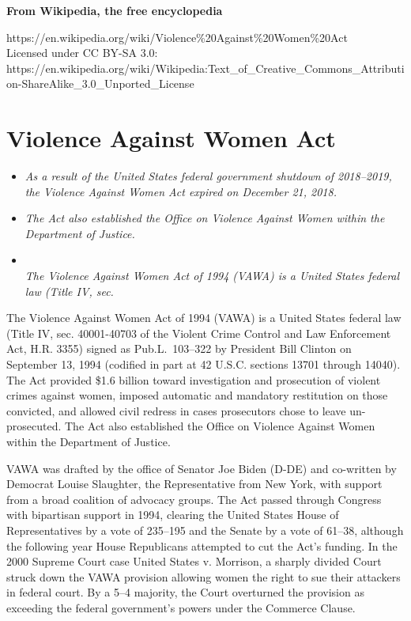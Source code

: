 \textbf{From Wikipedia, the free encyclopedia}

https://en.wikipedia.org/wiki/Violence\%20Against\%20Women\%20Act\\
Licensed under CC BY-SA 3.0:\\
https://en.wikipedia.org/wiki/Wikipedia:Text\_of\_Creative\_Commons\_Attribution-ShareAlike\_3.0\_Unported\_License

\section{Violence Against Women Act}\label{violence-against-women-act}

\begin{itemize}
\item
  \emph{As a result of the United States federal government shutdown of
  2018--2019, the Violence Against Women Act expired on December 21,
  2018.}
\item
  \emph{The Act also established the Office on Violence Against Women
  within the Department of Justice.}
\item
  \emph{\\
  The Violence Against Women Act of 1994 (VAWA) is a United States
  federal law (Title IV, sec.}
\end{itemize}

The Violence Against Women Act of 1994 (VAWA) is a United States federal
law (Title IV, sec. 40001-40703 of the Violent Crime Control and Law
Enforcement Act, H.R. 3355) signed as Pub.L.~103--322 by President Bill
Clinton on September 13, 1994 (codified in part at 42 U.S.C. sections
13701 through 14040). The Act provided \$1.6 billion toward
investigation and prosecution of violent crimes against women, imposed
automatic and mandatory restitution on those convicted, and allowed
civil redress in cases prosecutors chose to leave un-prosecuted. The Act
also established the Office on Violence Against Women within the
Department of Justice.

VAWA was drafted by the office of Senator Joe Biden (D-DE) and
co-written by Democrat Louise Slaughter, the Representative from New
York, with support from a broad coalition of advocacy groups. The Act
passed through Congress with bipartisan support in 1994, clearing the
United States House of Representatives by a vote of 235--195 and the
Senate by a vote of 61--38, although the following year House
Republicans attempted to cut the Act's funding. In the 2000 Supreme
Court case United States v. Morrison, a sharply divided Court struck
down the VAWA provision allowing women the right to sue their attackers
in federal court. By a 5--4 majority, the Court overturned the provision
as exceeding the federal government's powers under the Commerce Clause.

